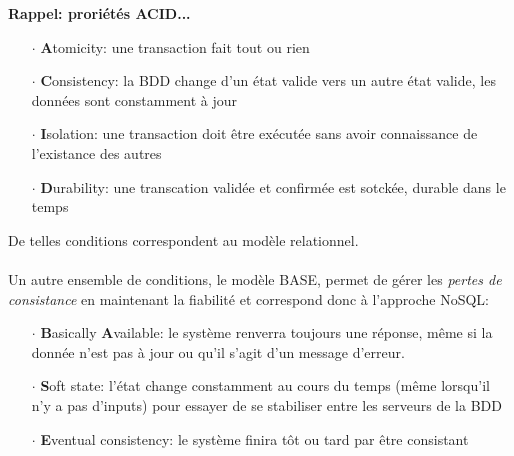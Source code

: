 \item{}
{\faux}
{\textbf{Rappel: proriétés ACID...}
\begin{itemize}\setlength{\itemsep}{.3em}
\item[$\cdot$]\textbf{A}tomicity: une transaction fait tout ou rien
\item[$\cdot$]\textbf{C}onsistency: la BDD change d'un état valide vers un autre état valide, les données sont constamment à jour
\item[$\cdot$]\textbf{I}solation: une transaction doit être exécutée sans avoir connaissance de l'existance des autres
\item[$\cdot$]\textbf{D}urability: une transcation validée et confirmée est sotckée, durable dans le temps
\end{itemize}

De telles conditions correspondent au modèle relationnel.
\paragraph{}
Un autre ensemble de conditions, le modèle BASE, permet de gérer les \textit{pertes de consistance} en maintenant la fiabilité et correspond donc à l'approche NoSQL:
\begin{itemize}\setlength{\itemsep}{.3em}
\item[$\cdot$]\textbf{B}asically \textbf{A}vailable: le système renverra toujours une réponse, même si la donnée n'est pas à jour ou qu'il s'agit d'un message d'erreur.
\item[$\cdot$]\textbf{S}oft state: l'état change constamment au cours du temps (même lorsqu'il n'y a pas d'inputs) pour essayer de se stabiliser entre les serveurs de la BDD
\item[$\cdot$]\textbf{E}ventual consistency: le système finira tôt ou tard par être consistant
\end{itemize}
}